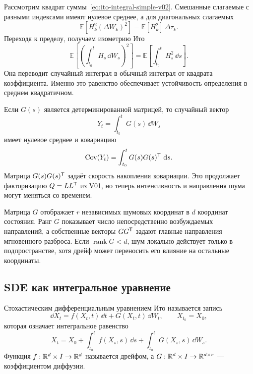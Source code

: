 Рассмотрим квадрат суммы~\eqref{eq:ito-integral-simple-v02}. Смешанные слагаемые с разными индексами имеют нулевое среднее, а для диагональных слагаемых
\[
\mathbb E\!\left[
H_k^2(\Delta W_k)^2
\right]
=
\mathbb E[H_k^2]\,\Delta\tau_k.
\]
Переходя к пределу, получаем изометрию Ито
\begin{equation}
\label{eq:ito-isometry-v02}
\mathbb E\!\left[
\left(
\int_{t_0}^{t}H_s\,\dd W_s
\right)^2
\right]
=
\mathbb E\!\left[
\int_{t_0}^{t}H_s^2\,\dd s
\right].
\end{equation}
Она переводит случайный интеграл в обычный интеграл от квадрата коэффициента. Именно это равенство обеспечивает устойчивость определения в среднем квадратичном.

Если $G(s)$ является детерминированной матрицей, то случайный вектор
\begin{equation}
\label{eq:deterministic-matrix-ito-v02}
Y_t=\int_{t_0}^{t}G(s)\,\dd W_s
\end{equation}
имеет нулевое среднее и ковариацию
\begin{equation}
\label{eq:ito-integral-covariance-v02}
\operatorname{Cov}(Y_t)
=
\int_{t_0}^{t}G(s)G(s)^{\mathsf{T}}\,\mathop{}\!\mathrm{d} s.
\end{equation}
Матрица $G(s)G(s)^{\mathsf{T}}$ задаёт скорость накопления ковариации. Это продолжает факторизацию $Q=LL^{\mathsf{T}}$ из V01, но теперь интенсивность и направления шума могут меняться со временем.

\begin{connection}
Матрица $G$ отображает $r$ независимых шумовых координат в $d$ координат состояния. Ранг $G$ показывает число непосредственно возбуждаемых направлений, а собственные векторы $GG^{\mathsf{T}}$ задают главные направления мгновенного разброса. Если $\operatorname{rank}G<d$, шум локально действует только в подпространстве, хотя дрейф может переносить его влияние на остальные координаты.
\end{connection}

\subsection{SDE как интегральное уравнение}

\begin{definition}
Стохастическим дифференциальным уравнением Ито называется запись
\begin{equation}
\label{eq:general-ito-sde-v02}
\dd X_t
=
f(X_t,t)\,\dd t
+
G(X_t,t)\,\dd W_t,
\qquad
X_{t_0}=X_0,
\end{equation}
которая означает интегральное равенство
\begin{equation}
\label{eq:general-ito-integral-equation-v02}
X_t
=
X_0
+
\int_{t_0}^{t}f(X_s,s)\,\dd s
+
\int_{t_0}^{t}G(X_s,s)\,\dd W_s.
\end{equation}
Функция $f:\mathbb{R}^d\times I\to\mathbb{R}^d$ называется дрейфом, а $G:\mathbb{R}^d\times I\to\mathbb{R}^{d\times r}$ --- коэффициентом диффузии.
\end{definition}

